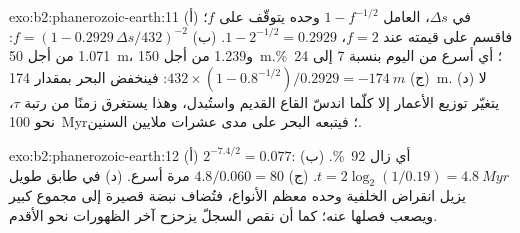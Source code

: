 \begin{solution}{exo:b2:phanerozoic-earth:11}
(أ) في $\Delta s$، العامل $1 - f^{-1/2}$ وحده يتوقّف على $f$؛ فاقسم على قيمته عند $f = 2$،
$1 - 2^{-1/2} = 0.2929$. (ب) $f = (1 - 0.2929\,\Delta s/432)^{-2}$: 1.071 من أجل \qty{50}{m}، و1.239
من أجل \qty{150}{m}؛ أي أسرع من اليوم بنسبة 7 إلى \qty{24}{\percent}. (ج) $432 \times (1 -
0.8^{-1/2})/0.2929 = \qty{-174}{m}$: فينخفض البحر بمقدار \qty{174}{m}. (د) لا يتغيّر توزيع
الأعمار إلا كلّما اندسّ القاع القديم واستُبدل، وهذا يستغرق زمنًا من رتبة $\tau$،
نحو \qty{100}{Myr}؛ فيتبعه البحر على مدى عشرات ملايين السنين.
\end{solution}

\begin{solution}{exo:b2:phanerozoic-earth:12}
(أ) $2^{-7.4/2} = 0.077$: أي زال \qty{92}{\percent}. (ب) $t = 2\log_2(1/0.19) = \qty{4.8}{Myr}$.
(ج) $4.8/0.060 = 80$ مرة أسرع. (د) في طابق طويل يزيل انقراض الخلفية وحده
معظم الأنواع، فتُضاف نبضة قصيرة إلى مجموع كبير ويصعب فصلها عنه؛ كما أن
نقص السجلّ يزحزح آخر الظهورات نحو الأقدم.
\end{solution}

